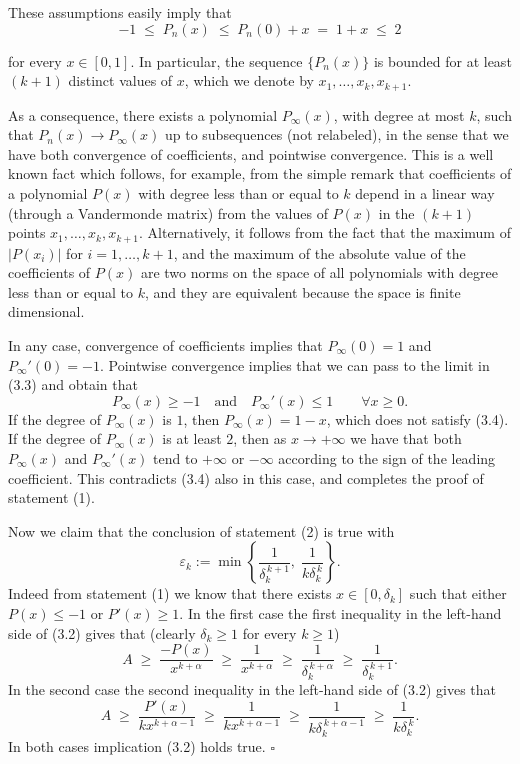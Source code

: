 \documentclass[11pt]{article}
\begin{document}
These assumptions easily imply that
\[
-1 \;\le\; P_n(x) \;\le\; P_n(0)+x \;=\; 1+x \;\le\; 2
\]


for every $x \in [0,1]$. In particular, the sequence $\{P_n(x)\}$ is bounded for at least $(k+1)$
distinct values of $x$, which we denote by $x_1,\dots,x_k,x_{k+1}$.

As a consequence, there exists a polynomial $P_\infty(x)$, with degree at most $k$, such that
$P_n(x) \to P_\infty(x)$ up to subsequences (not relabeled), in the sense that we have both
convergence of coefficients, and pointwise convergence. This is a well known fact which follows, for
example, from the simple remark that coefficients of a polynomial $P(x)$ with degree less than or
equal to $k$ depend in a linear way (through a Vandermonde matrix) from the values of $P(x)$ in the
$(k+1)$ points $x_1,\dots,x_k,x_{k+1}$. Alternatively, it follows from the fact that the maximum of
$|P(x_i)|$ for $i=1,\dots,k+1$, and the maximum of the absolute value of the coefficients of $P(x)$
are two norms on the space of all polynomials with degree less than or equal to $k$, and they are
equivalent because the space is finite dimensional.

In any case, convergence of coefficients implies that $P_\infty(0)=1$ and $P_\infty'(0)=-1$.
Pointwise convergence implies that we can pass to the limit in (3.3) and obtain that
\begin{equation}
P_\infty(x) \ge -1 \quad\text{and}\quad P_\infty'(x) \le 1 \qquad \forall x \ge 0. \tag{3.4}
\end{equation}
If the degree of $P_\infty(x)$ is $1$, then $P_\infty(x)=1-x$, which does not satisfy (3.4). If the
degree of $P_\infty(x)$ is at least $2$, then as $x \to +\infty$ we have that both $P_\infty(x)$ and
$P_\infty'(x)$ tend to $+\infty$ or $-\infty$ according to the sign of the leading coefficient. This
contradicts (3.4) also in this case, and completes the proof of statement (1).

Now we claim that the conclusion of statement (2) is true with
\[
\varepsilon_k := \min\left\{\frac{1}{\delta_k^{\,k+1}},\;\frac{1}{k\delta_k^{\,k}}\right\}.
\]
Indeed from statement (1) we know that there exists $x \in [0,\delta_k]$ such that either
$P(x) \le -1$ or $P'(x) \ge 1$. In the first case the first inequality in the left-hand side of (3.2)
gives that (clearly $\delta_k \ge 1$ for every $k \ge 1$)
\[
A \;\ge\; \frac{-P(x)}{x^{k+\alpha}} \;\ge\; \frac{1}{x^{k+\alpha}} \;\ge\; \frac{1}{\delta_k^{\,k+\alpha}}
\;\ge\; \frac{1}{\delta_k^{\,k+1}}.
\]
In the second case the second inequality in the left-hand side of (3.2) gives that
\[
A \;\ge\; \frac{P'(x)}{kx^{k+\alpha-1}} \;\ge\; \frac{1}{kx^{k+\alpha-1}} \;\ge\;
\frac{1}{k\delta_k^{\,k+\alpha-1}} \;\ge\; \frac{1}{k\delta_k^{\,k}}.
\]
In both cases implication (3.2) holds true. \hfill$\square$
\end{document}
